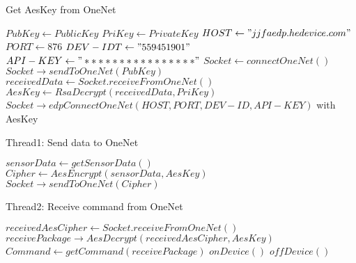 \documentclass{article}
\begin{document}
\begin{algorithm}
\caption{Get AesKey from OneNet}
\begin{algorithmic}[1]
\STATE $PubKey \leftarrow Public Key$
\STATE $PriKey \leftarrow Private Key$
\STATE $HOST \leftarrow "jjfaedp.hedevice.com"$
\STATE $PORT \leftarrow 876$
\STATE $DEV-IDT \leftarrow "559451901"$
\STATE $API-KEY \leftarrow "****************"$
\STATE $Socket \leftarrow connectOneNet()$
\STATE $Socket \rightarrow sendToOneNet(PubKey)$
\STATE $receivedData \leftarrow Socket.receiveFromOneNet()$
\STATE $AesKey \leftarrow RsaDecrypt(receivedData,PriKey)$
\STATE $Socket \rightarrow edpConnectOneNet(HOST,PORT,DEV-ID,API-KEY)$ with AesKey
\end{algorithmic}
\end{algorithm}

\begin{algorithm}
\caption{Thread1: Send data to OneNet}
\begin{algorithmic}[1]
\STATE $sensorData \leftarrow getSensorData()$
\STATE $Cipher \leftarrow AesEncrypt(sensorData,AesKey)$
\STATE $Socket \rightarrow sendToOneNet(Cipher)$
\ENDWHILE
\end{algorithmic}
\end{algorithm}

\begin{algorithm}
\caption{Thread2: Receive command from OneNet}
\begin{algorithmic}[1]
\STATE $receivedAesCipher \leftarrow Socket.receiveFromOneNet()$
\STATE $receivePackage \rightarrow AesDecrypt(receivedAesCipher,AesKey)$
\STATE $Command \leftarrow getCommand(receivePackage)$
\STATE $onDevice()$
\ENDIF
{}
\STATE $offDevice()$
\ENDIF
\ENDWHILE
\end{algorithmic}
\end{algorithm}
\end{document}
